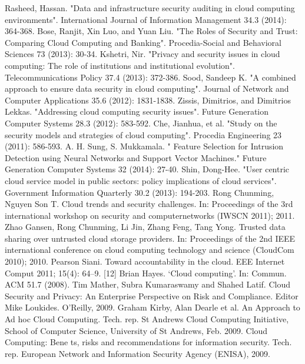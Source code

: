 \documentclass[a4paper,oneside,12pt]{report}
\begin{document}
 
 
 
\begin{thebibliography}{99}
\begin{LTRbibitems}
\resetlatinfont
{}
Rasheed, Hassan. "Data and infrastructure security auditing in cloud computing environments". International Journal of Information Management 34.3 (2014): 364-368.
Bose, Ranjit, Xin Luo, and Yuan Liu. "The Roles of Security and Trust: Comparing Cloud Computing and Banking". Procedia-Social and Behavioral Sciences 73 (2013): 30-34.
Kshetri, Nir. "Privacy and security issues in cloud computing: The role of institutions and institutional evolution". Telecommunications Policy 37.4 (2013): 372-386.
Sood, Sandeep K. "A combined approach to ensure data security in cloud computing". Journal of Network and Computer Applications 35.6 (2012): 1831-1838.
Zissis, Dimitrios, and Dimitrios Lekkas. "Addressing cloud computing security issues". Future Generation Computer Systems 28.3 (2012): 583-592.
Che, Jianhua, et al. "Study on the security models and strategies of cloud computing". Procedia Engineering 23 (2011): 586-593.
A. H. Sung, S. Mukkamala. " Feature Selection for Intrusion Detection using
Neural Networks and Support Vector Machines." Future Generation Computer Systems 32 (2014): 27-40.
Shin, Dong-Hee. "User centric cloud service model in public sectors: policy implications of cloud services". Government Information Quarterly 30.2 (2013): 194-203.
Rong Chunming, Nguyen Son T. Cloud trends and security challenges. In: Proceedings of the 3rd international workshop on security and computernetworks (IWSCN 2011); 2011.
Zhao Gansen, Rong Chunming, Li Jin, Zhang Feng, Tang Yong. Trusted data sharing over untrusted cloud storage providers. In: Proceedings of the 2nd IEEE international conference on cloud computing technology and science (CloudCom 2010); 2010.
Pearson Siani. Toward accountability in the cloud. EEE Internet Comput 2011; 15(4): 64–9.
[12]	Brian Hayes. `Cloud computing'. In: Commun. ACM 51.7 (2008).
Tim Mather, Subra Kumaraswamy and Shahed Latif. Cloud Security and Privacy: An Enterprise Perspective on Risk and Compliance. Editor Mike Loukides. O'Reilly, 2009.
Graham Kirby, Alan Dearle et al. An Approach to Ad hoc Cloud Computing. Tech. rep. St Andrews Cloud Computing Initiative, School of Computer Science, University of St Andrews, Feb. 2009.
Cloud Computing: Bene ts, risks and recommendations for information security. Tech. rep. European Network and Information Security Agency (ENISA), 2009.

\end{LTRbibitems}
\end{thebibliography}
\end{document}
